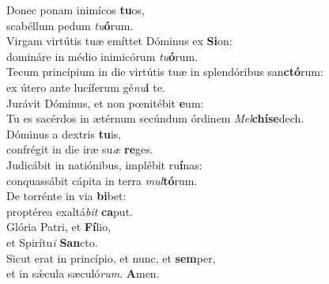 \evenverse Donec ponam inimícos \textbf{tu}os,~\*\\
\evenverse scabéllum pedum \textit{tu}\textbf{ó}rum.\\
\oddverse Virgam virtútis tuæ emíttet Dóminus ex \textbf{Si}on:~\*\\
\oddverse domináre in médio inimicórum \textit{tu}\textbf{ó}rum.\\
\evenverse Tecum princípium in die virtútis tuæ in splendóribus san\textbf{ctó}rum:~\*\\
\evenverse ex útero ante lucíferum gé\textit{nu}\textbf{i} te.\\
\oddverse Jurávit Dóminus, et non pœnitébit \textbf{e}um:~\*\\
\oddverse Tu es sacérdos in ætérnum secúndum órdinem \textit{Mel}\textbf{chí}\textbf{se}dech.\\
\evenverse Dóminus a dextris \textbf{tu}is,~\*\\
\evenverse confrégit in die iræ su\textit{æ} \textbf{re}ges.\\
\oddverse Judicábit in natiónibus, implébit ru\textbf{í}nas:~\*\\
\oddverse conquassábit cápita in terra \textit{mul}\textbf{tó}rum.\\
\evenverse De torrénte in via \textbf{bi}bet:~\*\\
\evenverse proptérea exaltá\textit{bit} \textbf{ca}put.\\
\oddverse Glória Patri, et \textbf{Fí}lio,~\*\\
\oddverse et Spirítu\textit{i} \textbf{San}cto.\\
\evenverse Sicut erat in princípio, et nunc, et \textbf{sem}per,~\*\\
\evenverse et in sǽcula sæculó\textit{rum}. \textbf{A}men.\\
